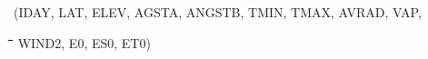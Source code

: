 \begin{indenting}{3.81cm}
(IDAY, LAT, ELEV, AGSTA, ANGSTB, TMIN, TMAX, AVRAD, VAP,
\end{indenting}
\begin{tabbing}
\hspace{1.27cm}\=\hspace{1.27cm}\=\hspace{1.27cm}\=\hspace{1.27cm}\=%
\hspace{1.27cm}\=\hspace{1.27cm}\=\hspace{1.27cm}\=\hspace{1.27cm}\=%
\hspace{1.27cm}\=\hspace{1.27cm}\=\kill
 \>\> \> \>  WIND2, E0, ES0, ET0)
\end{tabbing}
\nwln
